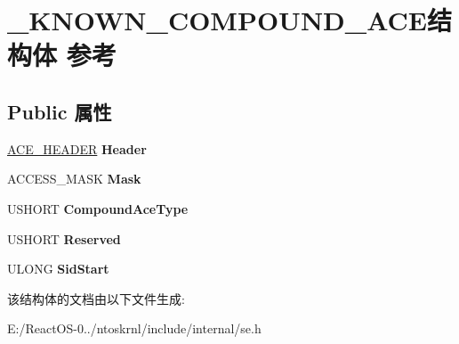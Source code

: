 \hypertarget{struct___k_n_o_w_n___c_o_m_p_o_u_n_d___a_c_e}{}\section{\+\_\+\+K\+N\+O\+W\+N\+\_\+\+C\+O\+M\+P\+O\+U\+N\+D\+\_\+\+A\+C\+E结构体 参考}
\label{struct___k_n_o_w_n___c_o_m_p_o_u_n_d___a_c_e}
\subsection*{Public 属性}
\begin{DoxyCompactItemize}
\item 
\mbox{\label{struct___k_n_o_w_n___c_o_m_p_o_u_n_d___a_c_e_a035e9182e8c151e0bd53b877d98558d1}} 
\hyperlink{struct___a_c_e___h_e_a_d_e_r}{A\+C\+E\+\_\+\+H\+E\+A\+D\+ER} {\bfseries Header}
\item 
\mbox{\label{struct___k_n_o_w_n___c_o_m_p_o_u_n_d___a_c_e_aeb54c4357fd58a5fcc8b4c0967f78b5e}} 
A\+C\+C\+E\+S\+S\+\_\+\+M\+A\+SK {\bfseries Mask}
\item 
\mbox{\label{struct___k_n_o_w_n___c_o_m_p_o_u_n_d___a_c_e_a8c579ae94a1c72ece91734b809c6afcd}} 
U\+S\+H\+O\+RT {\bfseries Compound\+Ace\+Type}
\item 
\mbox{\label{struct___k_n_o_w_n___c_o_m_p_o_u_n_d___a_c_e_a278c752bbc6257b967e7e44c2138c886}} 
U\+S\+H\+O\+RT {\bfseries Reserved}
\item 
\mbox{\label{struct___k_n_o_w_n___c_o_m_p_o_u_n_d___a_c_e_ab0efebdf65abc020f69aad2c367353af}} 
U\+L\+O\+NG {\bfseries Sid\+Start}
\end{DoxyCompactItemize}


该结构体的文档由以下文件生成\+:\begin{DoxyCompactItemize}
\item 
E\+:/\+React\+O\+S-\/0../ntoskrnl/include/internal/se.\+h\end{DoxyCompactItemize}

